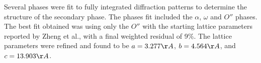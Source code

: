 Several phases were fit to fully integrated diffraction patterns to determine the structure of the secondary phase. The phases fit included the $\alpha$, $\omega$ and $O''$ phases. The best fit obtained was using only the $O''$ with the starting lattice parameters reported by Zheng et al., with a final weighted residual of 9\%. The lattice parameters were refined and found to be $a = 3.277\AA$, $b = 4.564 \AA$, and $c = 13.903 \AA$. 